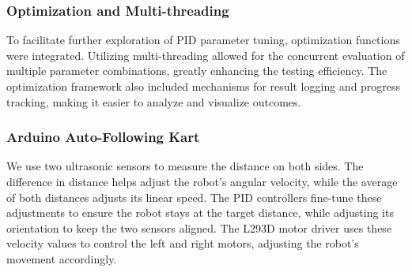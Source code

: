 \documentclass[a4paper,12pt]{./article}
\begin{document}
\subsubsection{Optimization and Multi-threading}
To facilitate further exploration of PID parameter tuning, optimization functions were integrated. Utilizing multi-threading allowed for the concurrent evaluation of multiple parameter combinations, greatly enhancing the testing efficiency. The optimization framework also included mechanisms for result logging and progress tracking, making it easier to analyze and visualize outcomes.
\subsubsection{Arduino Auto-Following Kart}
We use two ultrasonic sensors to measure the distance on both sides. The difference in distance helps adjust the robot's angular velocity, while the average of both distances adjusts its linear speed. The PID controllers fine-tune these adjustments to ensure the robot stays at the target distance, while adjusting its orientation to keep the two sensors aligned. The L293D motor driver uses these velocity values to control the left and right motors, adjusting the robot's movement accordingly.
\end{document}
